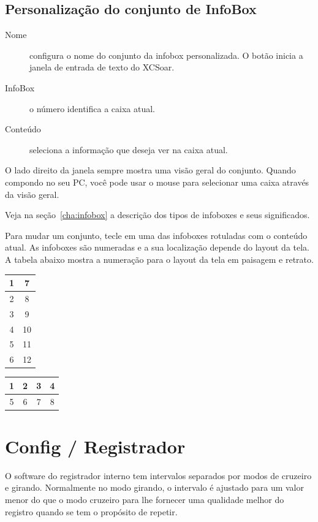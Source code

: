 \subsection*{Personalização do conjunto de InfoBox}

\begin{description}
\item[Nome]  configura o nome do conjunto da infobox personalizada.  O botão inicia a janela de entrada de texto do XCSoar.
\item[InfoBox]  o número identifica a caixa atual.
\item[Conteúdo] seleciona a informação que deseja ver na caixa atual.
\end{description}

O lado direito da janela sempre mostra uma visão geral do conjunto.  Quando compondo no seu PC, você pode usar o mouse para selecionar uma caixa através da visão geral.

Veja na seção~\ref{cha:infobox} a descrição dos tipos de infoboxes e seus significados.

Para mudar um conjunto, tecle em uma das infoboxes rotuladas com o conteúdo atual.  As infoboxes são numeradas e a sua localização depende do layout da tela.  A tabela abaixo mostra a numeração para o layout da tela em paisagem e retrato. 

\begin{multicols}{2}
\begin{tabular}{|c|c|}
\hline
1 & 7 \\
\hline
2 & 8 \\
\hline
3 & 9 \\
\hline
4 & 10 \\
\hline
5 & 11 \\
\hline
6 & 12 \\
\hline
\end{tabular}

\begin{tabular}{|c|c|c|c|}
\hline
1 & 2 & 3 & 4 \\
\hline
5 & 6 & 7 & 8 \\
\hline
\end{tabular}
\end{multicols}


\section{Config / Registrador} \label{conf:logger}

O software do registrador interno tem intervalos separados por modos de cruzeiro e girando.  Normalmente no modo girando, o intervalo é ajustado para um valor menor do que o modo cruzeiro para lhe fornecer uma qualidade melhor do registro quando se tem o propósito de repetir.

